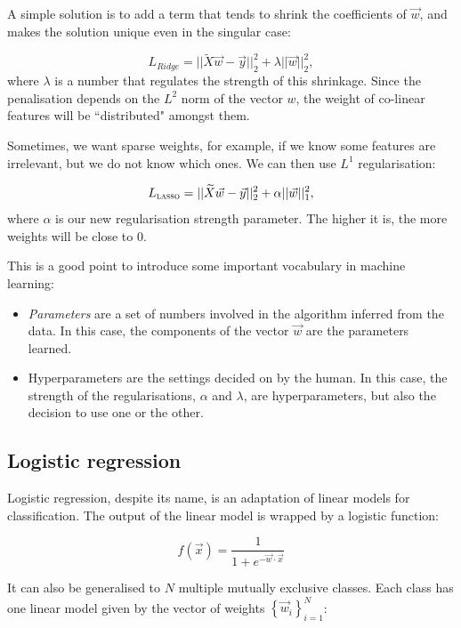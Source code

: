 A simple solution  is to add a term that tends to shrink the coefficients of $\vec w$, and makes the solution unique even in the singular case:

\[ L_{Ridge} = || \widetilde  X \vec w - \vec y ||_2 ^2 + \lambda ||\vec w||_2^2,\]
where $\lambda$ is a number that regulates the strength of this shrinkage.
Since the penalisation depends on the $L^2$ norm of the vector $w$, the weight of co-linear features will be ``distributed" amongst them.

Sometimes, we want sparse weights, \sidenote{\LASSO} for example, if we know some features are irrelevant, but we do not know which ones.
We can then use $L^1$ regularisation:

\[ L_{\textsc{lasso}} = || \widetilde X \vec w - \vec y ||_2 ^2 + \alpha ||\vec w||_1^2,\]
where $\alpha$ is our new regularisation strength parameter.
The higher it is, the more weights will be close to $0$.

This is a good point to introduce
some important vocabulary in machine learning:

\begin{itemize}
	\item \emph{Parameters} are a set of numbers involved in the algorithm inferred from the data.
	In this case, the components of the vector $\vec{w}$ are the parameters learned.
	\item {Hyperparameters} are the settings decided on by the human.
	In this case, the strength of the regularisations, $\alpha$ and $\lambda$, are hyperparameters, but also the decision to use one or the other.
\end{itemize}
 
\subsection{Logistic regression}\label{sec:logistic_regression}
Logistic regression, despite its name,  is an adaptation of linear models for classification.
The output of the linear model is wrapped by a logistic function:

\begin{equation*}
f(\vec x) = \frac{1}{1 + e^{- \vec{w} \cdot \vec x}}
\end{equation*}

It can also be generalised to $N$ multiple mutually exclusive classes.
Each class has one linear model given by the vector of weights $\left\{\vec w_i \right\}_{i=1} ^N$:

